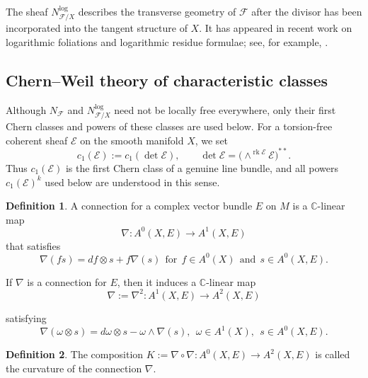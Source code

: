 \documentclass[12pt,reqno,a4paper]{amsart}
\numberwithin{equation}{section}
\theoremstyle{plain}
\theoremstyle{definition}
\newtheorem{definition}[definition]{Definition}
\DeclareMathOperator{\rk}{rk}
\newcommand{\cF}{\mathcal{F}}
\begin{document}
The sheaf $N_{\cF/X}^{\log}$ describes the transverse geometry of $\cF$ after
the divisor has been incorporated into the tangent structure of $X$. It has
appeared in recent work on logarithmic foliations and logarithmic residue
formulae; see, for example, \cite{CoLoMa,CoMa1,CoMa3,CaEla}.

 
 

\subsection{Chern--Weil theory of characteristic classes}

Although \(N_{\cF}\) and \(N_{\cF/X}^{\log}\) need not be locally free everywhere,
only their first Chern classes and powers of these classes are used below. For a
torsion-free coherent sheaf \(\mathcal E\) on the smooth manifold \(X\), we set
\[
c_1(\mathcal E):=c_1(\det\mathcal E),
\qquad
\det\mathcal E=
\bigl(\wedge^{\rk\mathcal E}\mathcal E\bigr)^{\ast\ast}.
\]
Thus \(c_1(\mathcal E)\) is the first Chern class of a genuine line bundle, and
all powers \(c_1(\mathcal E)^k\) used below are understood in this sense.


 

\begin{definition} A connection for a complex vector bundle $E$ on $M$ is a $\mathbb{C}$-linear map
$$ \nabla : A^{0} (X,E) \longrightarrow A^{1} (X, E) $$
that satisfies
$$ \nabla(fs)=df\otimes s+f\nabla(s) \ \ \mbox{for} \ \ f \in A^{0}(X) \ \ \mbox{and} \ \ s \in A^{0}(X,E).$$

\end{definition}
If $\nabla$ is a connection for $E$, then it induces a $\mathbb{C}$-linear map
$$ \nabla := \nabla^{2} : A^{1}(X,E) \longrightarrow A^{2}(X,E) $$

\noindent satisfying
$$ \nabla (\omega \otimes s) = d\omega \otimes s - \omega \wedge \nabla (s), \ \ \omega \in A^{1}(X), \ \ s \in A^{0} (X,E).$$


\begin{definition} The composition $K := \nabla \circ \nabla : A^{0} (X,E) \longrightarrow A^{2} (X,E)$ is called the curvature of the connection $\nabla$.


\end{definition}
\end{document}
